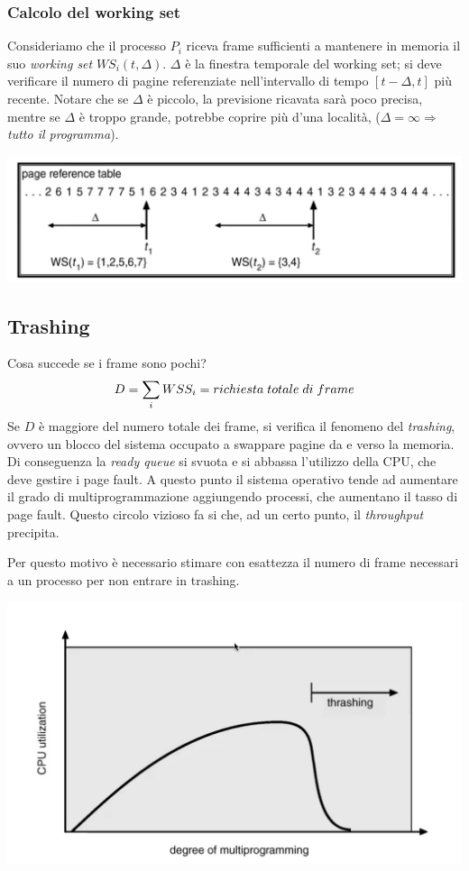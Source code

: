 \documentclass[a4paper,12pt, twoside]{report}
\begin{document}
\subsubsection{Calcolo del working set}

Consideriamo che il processo $P_i$ riceva frame sufficienti a mantenere in memoria il suo \emph{working set} $WS_i (t, \Delta)$.
$\Delta$ \`e la finestra temporale del working set; si deve verificare il numero di pagine referenziate nell'intervallo di 
tempo $[t-\Delta, t]$ pi\`u recente. Notare che se $\Delta$ \`e piccolo, la previsione ricavata sar\`a poco precisa, mentre se 
$\Delta$ \`e troppo grande, potrebbe coprire pi\`u d'una localit\`a, ($\Delta = \infty \Rightarrow$ \emph{tutto il programma}).

\begin{center}
    \includegraphics[scale=0.2]{working_set_example}
\end{center}

\subsection{Trashing}
Cosa succede se i frame sono pochi?
\[ D = \sum_i WSS_i = richiesta\thickspace totale \thickspace di \thickspace frame\]
Se $D$ \`e maggiore del numero totale dei frame, si verifica il fenomeno del \emph{trashing}, ovvero un blocco 
del sistema occupato a swappare pagine da e verso la memoria. Di conseguenza la \emph{ready queue} si svuota e 
si abbassa l'utilizzo della CPU, che deve gestire i page fault. A questo punto il sistema operativo tende ad 
aumentare il grado di multiprogrammazione aggiungendo processi, che aumentano il tasso di page fault. Questo 
circolo vizioso fa si che, ad un certo punto, il \emph{throughput} precipita. 

Per questo motivo \`e necessario stimare con esattezza il numero di frame necessari a un processo per non 
entrare in trashing. 

\begin{center}
    \includegraphics[scale=0.2]{trashing_diagram}
\end{center}
\end{document}
